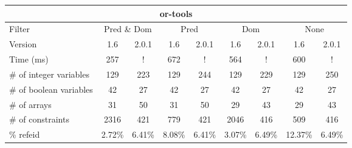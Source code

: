 \documentclass{standalone}
\begin{document}
\begin{table}[H]
\footnotesize
\begin{tabular}{lc|c|c|c|c|c|c|c}
\multicolumn{9}{c}{or-tools} \\ 
\hline\hline Filter & \multicolumn{2}{c|}{Pred \& Dom} &\multicolumn{2}{c|}{Pred}  & \multicolumn{2}{c|}{Dom} & \multicolumn{2}{c}{None} \\ 
\hline Version & 1.6 & 2.0.1 & 1.6 & 2.0.1 & 1.6 & 2.0.1 & 1.6 & 2.0.1 \\ 
Time (ms)               & 257 & ! & 672 & ! & 564 & ! & 600 & ! \\ 
\# of integer variables & 129 & 223 & 129 & 244 & 129 & 229 & 129 & 250 \\ 
\# of boolean variables & 42 & 27 & 42 & 27 & 42 & 27 & 42 & 27 \\ 
\# of arrays            & 31 & 50 & 31 & 50 & 29 & 43 & 29 & 43 \\ 
\# of constraints       & 2316 & 421 & 779 & 421 & 2046 & 416 & 509 & 416 \\ 
\% refeid               & 2.72\% & 6.41\% & 8.08\% & 6.41\% & 3.07\% & 6.49\% & 12.37\% & 6.49\% \\ 
\end{tabular}
\end{table}
\end{document}
